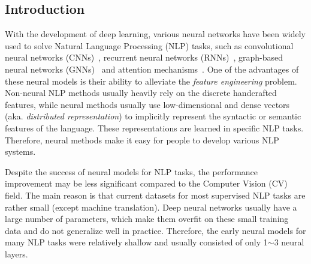 \documentclass[fleqn]{SCYE-arxiv}
\begin{document}
\begin{multicols}{2}

\section{Introduction}\label{sec:intro}

With the development of deep learning, various neural networks have been widely used to solve  Natural Language Processing (NLP) tasks, such as convolutional neural networks (CNNs)~\cite{kalchbrenner2014convolutional,kim2014convolutional,gehring2017convolutional}, recurrent neural networks (RNNs)~\cite{sutskever2014sequence,liu2016recurrent}, graph-based neural networks (GNNs)~\cite{socher2013recursive,tai2015improved,DBLP:conf/naacl/MarcheggianiBT18} and attention mechanisms~\cite{bahdanau2014neural,vaswani2017transformer}.
One of the advantages of these neural models is their ability to alleviate the \textit{feature engineering} problem. Non-neural NLP methods usually heavily rely on the discrete handcrafted features, while neural methods usually use low-dimensional and dense vectors (aka. \textit{distributed representation}) to implicitly represent the syntactic or semantic features of the language. These representations are learned in specific NLP tasks. Therefore, neural methods make it easy for people to develop various NLP systems.




Despite the success of neural models for NLP tasks, the performance improvement may be less significant compared to the Computer Vision (CV) field. The main reason is that current datasets for most supervised NLP tasks are rather small (except machine translation). Deep neural networks usually have a large number of parameters, which make them overfit on these small training data and do not generalize well in practice. Therefore, the early neural models for many NLP tasks were relatively shallow and usually consisted of only 1$\sim$3 neural layers.




\end{multicols}
\end{document}
